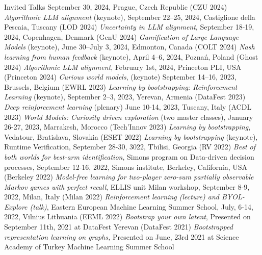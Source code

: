\documentclass{resume}
\begin{document}
\begin{category}{Invited Talks}
         September 30,  2024, Prague, Czech Republic
	 ({\sf CZU 2024}) 
 	\citembullet
	\emph{Algorithmic LLM alignment} (keynote),
        September 22--25, 2024, Castiglione della Pescaia, Tuscany
	 ({\sf LOD 2024})
	\citembullet
	\emph{Uncertainty in LLM alignment}, 
        September 18-19, 2024, Copenhagen, Denmark
	 ({\sf GenU 2024})	 		 	 	 
	\citembullet
	\emph{Gamification of Large Language Models} (keynote),
	June 30--July 3, 2024, Edmonton, Canada
	 ({\sf COLT  2024})	 	 
	\citembullet
	\emph{Nash learning from human feedback}  (keynote),
         April 4--6, 2024, Pozna\'n, Poland
	 ({\sf Ghost 2024})	 
	\citembullet
	\emph{Algorithmic LLM alignment},  
         February 1st, 2024, Princeton PLI, USA
	 ({\sf Princeton 2024})
	\citembullet
	\emph{Curious world models},  (keynote)
         September 14--16, 2023, Brussels, Belgium
	 ({\sf EWRL 2023})
	\citembullet
	\emph{Learning by bootstrapping: Reinforcement Learning} (keynote),
         September 2--3, 2023, Yerevan, Armenia
	 ({\sf DataFest 2023})
	\citembullet
	\emph{Deep reinforcement learning}  (plenary)
         June 10-14, 2023, Tuscany, Italy
	 ({\sf ACDL 2023})
	\citembullet
	\emph{World Models: Curiosity driven exploration} (two master classes), 
         January 26-27, 2023, Marrakesh, Morocco
	 ({\sf  Tech'Innov 2023})	 
	\citembullet
	\emph{Learning by bootstrapping}, 
	 Vedatour, Bratislava, Slovakia
	 ({\sf ESET 2022})
	\citembullet
	\emph{Learning by bootstrapping} (keynote), 
	 Runtime Verification, September 28-30, 3022, Tbilisi, Georgia
	 ({\sf RV 2022})
\citembullet
\emph{Best of both worlds for best-arm identification}, 
 Simons program on Data-driven decision processes, September 12-16, 2022, Simons institute, Berkeley, California, USA
 ({\sf Berkeley 2022})
\citembullet
\emph{Model-free learning for two-player zero-sum partially observable Markov games with perfect recall}, 
 ELLIS unit Milan workshop, September 8-9, 2022,  Milan, Italy  
 ({\sf Milan 2022})
\citembullet
\emph{Reinforcement learning (lecture) and BYOL-Explore (talk)}, 
 Eastern European Machine Learning Summer School, July, 6-14, 2022, Vilnius Lithuania
 ({\sf EEML 2022})
\citembullet
\emph{Bootstrap your own latent}, 
Presented on September 11th, 2021 at  DataFest Yerevan
({\sf DataFest 2021})
\citembullet
\emph{Bootstrapped representation learning on graphs,} 
Presented on June, 23rd 2021 at  Science Academy of Turkey Machine Learning Summer School

\end{category}
\end{document}

